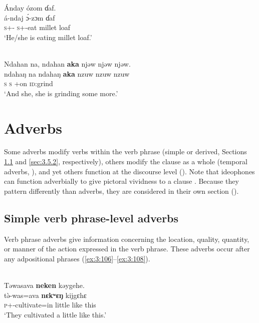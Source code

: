 \ea \label{ex:3:104}
Ánday  ózom  ɗaf.\\
\gll  á-ndaj    \'{ɔ}-zɔm     ɗaf\\
      \textsc{s}+{\IFV}-{\PROG}  \textsc{s}+{\IFV}-eat  {millet loaf}\\
\glt  ‘He/she is eating millet loaf.’
\z

\ea \label{ex:3:105}\\
Ndahan  na,  ndahan    \textbf{aka}  njəw  njəw  njəw.\\
\gll ndahaŋ   na    ndahaŋ   \textbf{aka}          {nzuw  nzuw  nzuw}\\
      \textsc{s}                   {\PSP}    \textsc{s}           {\EXT}+on       \textsc{id}:grind\\
\glt  ‘And she, she is grinding some more.'
\z

\section{Adverbs}\label{sec:3.5}
\hypertarget{RefHeading1211141525720847}{}
\largerpage Some adverbs modify verbs within the verb phrase (simple or derived, Sections \ref{sec:3.5.1} and \ref{sec:3.5.2}, respectively), others modify the clause as a whole (temporal adverbs, ), and yet others function at the discourse level (). Note that ideophones can function adverbially to give pictoral vividness to a clause \citep{Doke1935}. Because they pattern differently than adverbs, they are considered in their own section ().

\subsection{Simple verb phrase-level adverbs}\label{sec:3.5.1}
\hypertarget{RefHeading1211161525720847}{}
Verb phrase adverbs give information concerning the location, quality, quantity, or manner of the action expressed in the verb phrase. These adverbs occur after any adpositional phrases (\ref{ex:3:106}--\ref{ex:3:108}). 


\ea \label{ex:3:106}
\\
Təwasava  \textbf{neken} kəygehe.\\
\gll t\`{ə}-was=ava         \textbf{nɛkʷɛŋ}  kijgɛhɛ\\
      \textsc{p}+{\PFV}-cultivate=in       little    {like this}\\
\glt  ‘They cultivated a little like this.’
\z

